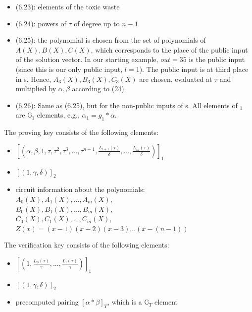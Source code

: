 \begin{itemize}
    \item (6.23): elements of the toxic waste
    \item (6.24): powers of \begin{math}\tau\end{math} of degree up to \(n-1\)
    \item (6.25): the polynomial is chosen from the set of polynomials of \(A(X), B(X), C(X)\), which corresponds to the place of the public input of the solution vector. In our starting example, \(out = 35\) is the public input (since this is our only public input, \(l=1\)). The public input is at third place in s. Hence, \(A_3(X), B_3(X), C_3(X)\) are chosen, evaluated at \begin{math}\tau\end{math} and multiplied by \begin{math} \alpha, \beta\end{math} according to (24).
    \item (6.26): Same as (6.25), but for the non-public inputs of s. All elements of \begin{math} [\sigma_1]_1 \end{math} are \begin{math}\mathbb{G}_1\end{math} elements, e.g., \begin{math}\alpha_1 = g_1 * \alpha\end{math}.
\end{itemize}

The proving key consists of the following elements:
\begin{itemize}
    \item \([(\alpha, \beta, 1, \tau, \tau^2, \tau^3, ..., \tau^{n-1}, \frac{L_{l+1}(\tau)}{\delta}, ..., \frac{L_m(\tau)}{\delta})]_1\)
    \item \([(1, \gamma, \delta)]_2\)
    \item circuit information about the polynomials: \\
    \(A_0(X), A_1(X), ..., A_m(X)\),\\
    \(B_0(X), B_1(X), ..., B_m(X)\),\\
    \(C_0(X), C_1(X), ..., C_m(X)\),\\
    \(Z(x) = (x-1)(x-2)(x-3)...(x-(n-1))\)\\
\end{itemize}

The verification key consists of the following elements:
\begin{itemize}
    \item \([(1, \frac{L_0(\tau)}{\gamma}, ..., \frac{L_l(\tau)}{\gamma})]_1\)
    \item \([(1, \gamma, \delta)]_2\)
    \item precomputed pairing \([\alpha * \beta]_T\), which is a \begin{math}\mathbb{G}_T\end{math} element
\end{itemize}

